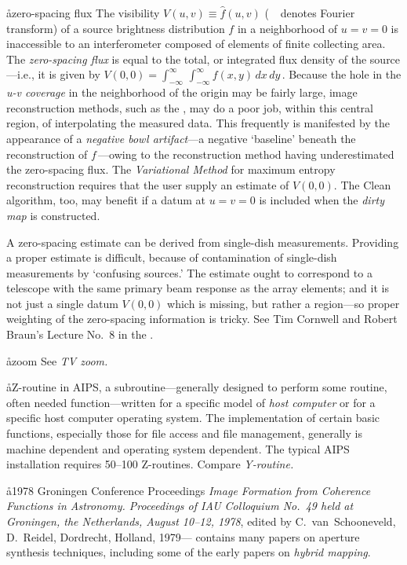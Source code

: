\aa{zero-spacing flux}
The visibility $V(u,v)\equiv\hat f(u,v)$ ($\ \hat{\phantom{.}}\ $
denotes Fourier transform)
of a source brightness distribution $f$ in a neighborhood of $u=v=0$
is inaccessible to an interferometer composed of elements of finite
collecting area.
The {\it zero-spacing flux} is equal to the total, or integrated flux
density of the source---i.e., it is given by
$V(0,0)=\int_{-\infty}^\infty\,\int_{-\infty}^\infty f(x,y)\,dx\,dy\,.$
Because the hole in the {\it u-v coverage} in the neighborhood of
the origin may be fairly large, image reconstruction methods,
such as the \hca\/, may do a poor job, within this central region,
of interpolating the measured data.
This frequently is manifested by the appearance of a
{\it negative bowl artifact}\/---a negative `baseline' beneath the
reconstruction of $f$\,---owing to the reconstruction method having
underestimated the zero-spacing flux.
The {\it Variational Method} for maximum entropy reconstruction
requires that the user supply an estimate of $V(0,0)$.
The Clean algorithm, too, may benefit if a datum at $u=v=0$ is included when
the {\it dirty map} is constructed.
\par
A zero-spacing estimate can be derived from single-dish measurements.
Providing a proper estimate is difficult, because of contamination
of single-dish measurements by `confusing sources.'
The estimate ought to correspond to a telescope with the same
primary beam response as the array elements;
and it is not just a single datum $V(0,0)$ which is missing,
but rather a region---so proper weighting of the zero-spacing
information is tricky.
See Tim Cornwell and Robert Braun's Lecture No.~8 in the \sira.

\aa{zoom} See {\it TV zoom.}

\aa{Z-routine}
in AIPS, a subroutine---generally designed to perform some
routine, often needed function---written for a specific model
of {\it host computer} or for a specific host computer operating system.
The implementation of certain basic functions, especially those for
file access and file management, generally is machine dependent
and operating system dependent.
The typical AIPS installation requires 50--100 Z-routines.
Compare {\it Y-routine.}

\aa{1978 Groningen Conference Proceedings}
{\it Image Formation from Coherence Functions in Astronomy.
Proceedings of IAU Colloquium No.~49 held at Groningen, the Netherlands,
August 10--12, 1978},
edited by C.~van~Schooneveld, D.~Reidel, Dordrecht, Holland, 1979---%
contains many papers on aperture synthesis techniques,
including some of the early papers on {\it hybrid mapping}.

